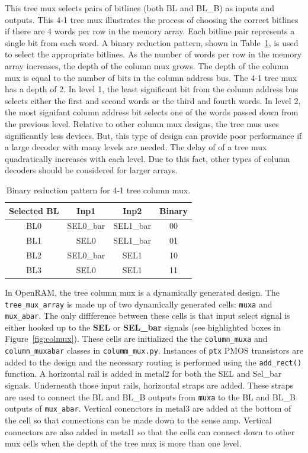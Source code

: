This tree mux selects pairs of bitlines (both BL and BL\_B) as inputs
and outputs.  This 4-1 tree mux illustrates the process of choosing
the correct bitlines if there are 4 words per row in the memory array.
Each bitline pair represents a single bit from each word.  A binary
reduction pattern, shown in Table~\ref{table:colmux}, is used to
select the appropriate bitlines.  As the number of words per row in
the memory array increases, the depth of the column mux grows.  The
depth of the column mux is equal to the number of bits in the column
address bus.  The 4-1 tree mux has a depth of 2.  In level 1, the
least significant bit from the column address bus selects either the
first and second words or the third and fourth words.  In level 2, the
most signifant column address bit selects one of the words passed down
from the previous level.  Relative to other column mux designs, the
tree mus uses significantly less devices.  But, this type of design
can provide poor performance if a large decoder with many levels are
needed.  The delay of of a tree mux quadratically increases with each
level.  Due to this fact, other types of column
decoders should be considered for larger arrays.

\begin{table}[h!] 
  \begin{center}
    \begin{tabular}{| c | c | c | c |}
    \hline
    Selected BL & Inp1 & Inp2 & Binary\\ \hline
    BL0 & SEL0\_bar & SEL1\_bar & 00\\ \hline
    BL1 & SEL0 & SEL1\_bar & 01\\ \hline
    BL2 & SEL0\_bar & SEL1 & 10\\ \hline
    BL3 & SEL0 & SEL1 & 11\\
    \hline
    \end{tabular}
  \end{center}
  \caption{Binary reduction pattern for 4-1 tree column mux.}
  \label{table:colmux}
\end{table} 

In OpenRAM, the tree column mux is a dynamically generated design.  The
\verb|tree_mux_array| is made up of two dynamically generated cells: \verb|muxa|
and \verb|mux_abar|.  The only diffference between these cells is that input
select signal is either hooked up to the \textbf{SEL} or
\textbf{SEL\_bar} signals (see highlighted boxes in
Figure~\ref{fig:colmux}).  These cells are initialized the the
\verb|column_muxa| and \verb|column_muxabar| classes in \verb|columm_mux.py|.  Instances
of \verb|ptx| PMOS transistors are added to the design and the necessary
routing is performed using the \verb|add_rect()| function. A horizontal rail
is added in metal2 for both the SEL and Sel\_bar signals.  Underneath
those input rails, horizontal straps are added.  These straps are used
to connect the BL and BL\_B outputs from \verb|muxa| to the BL and BL\_B
outputs of \verb|mux_abar|.  Vertical conenctors in metal3 are added at the
bottom of the cell so that connections can be made down to the sense
amp.  Vertical connectors are also added in metal1 so that the cells
can connect down to other mux cells when the depth of the tree mux is
more than one level.

